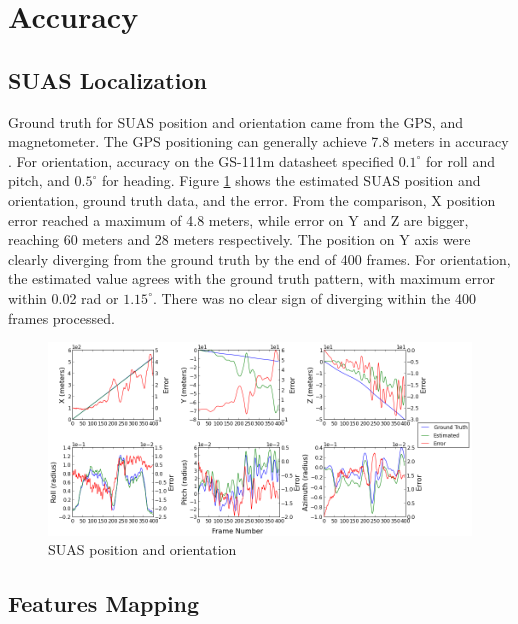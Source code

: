 \section{Accuracy}\label{sec:flight-accuracy}
\subsection{SUAS Localization}

Ground truth for SUAS position and orientation came from the GPS, and
magnetometer. The GPS positioning can generally achieve 7.8 meters in
accuracy \cite{_gps_????}. For orientation, accuracy on the GS-111m
datasheet specified $0.1^{\circ}$ for roll and pitch, and
$0.5^{\circ}$ for heading. Figure \ref{fltfig:6} shows the estimated
SUAS position and orientation, ground truth data, and the error. From
the comparison, X position error reached a maximum of 4.8 meters,
while error on Y and Z are bigger, reaching 60 meters and 28 meters
respectively. The position on Y axis were clearly diverging from the
ground truth by the end of 400 frames. For orientation, the estimated
value agrees with the ground truth pattern, with maximum error within
0.02 rad or $1.15^{\circ}$. There was no clear sign of diverging
within the 400 frames processed.

\begin{figure}[h]
\centering
\includegraphics[width=15.5cm, keepaspectratio=true]
{./Figures/fltfig/cut1/Figure30.png}
\caption{SUAS position and orientation}
\label{fltfig:6}
\end{figure}
\FloatBarrier
\subsection{Features Mapping}\label{sec:accuracy_features}

